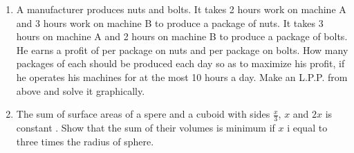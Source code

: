 \documentclass[journal,12pt,twocolumn]{IEEEtran}
\theoremstyle{remark}
\begin{document}
\begin{enumerate}
\item A manufacturer produces nuts and bolts. It takes 2 hours work on machine A and 3 hours work on machine B to produce a package of nuts. It takes 3 hours on machine A and 2 hours on machine B to produce a package of bolts. He earns a profit of  per package on nuts and  per package on bolts. How many packages of each should be produced each day so as to maximize his profit, if he operates his machines for at the most 10 hours a day. Make an L.P.P. from above and solve it graphically.\\
\item The sum of surface areas of a spere and a cuboid with sides $\frac{x}{3}$, $x$ and $2x$ is constant . Show that the sum of their volumes is minimum if $x$ i equal to three times the radius of sphere.
\end{enumerate}
\end{document}
